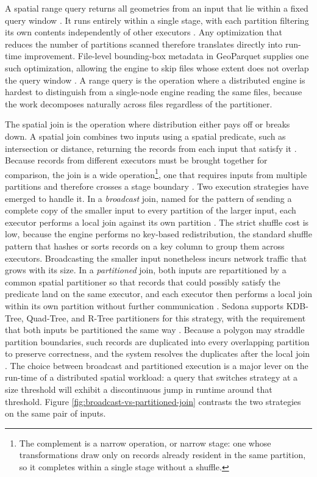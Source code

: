 A spatial range query returns all geometries from an input that lie within a fixed query window \parencite{yu2019_geospark_perspective_beyond}. It runs entirely within a single stage, with each partition filtering its own contents independently of other executors \parencite{yu2019_geospark_perspective_beyond}. Any optimization that reduces the number of partitions scanned therefore translates directly into run-time improvement. File-level bounding-box metadata in GeoParquet supplies one such optimization, allowing the engine to skip files whose extent does not overlap the query window \parencite{sedona2024_geoparquet_loader}. A range query is the operation where a distributed engine is hardest to distinguish from a single-node engine reading the same files, because the work decomposes naturally across files regardless of the partitioner.

The spatial join is the operation where distribution either pays off or breaks down. A spatial join combines two inputs using a spatial predicate, such as intersection or distance, returning the records from each input that satisfy it \parencite{yu2019_geospark_perspective_beyond}. Because records from different executors must be brought together for comparison, the join is a wide operation\footnote{The complement is a narrow operation, or narrow stage: one whose transformations draw only on records already resident in the same partition, so it completes within a single stage without a shuffle.}, one that requires inputs from multiple partitions and therefore crosses a stage boundary \parencite{yu2019_geospark_perspective_beyond}. Two execution strategies have emerged to handle it. In a \emph{broadcast} join, named for the pattern of sending a complete copy of the smaller input to every partition of the larger input, each executor performs a local join against its own partition \parencite{yu2019_geospark_perspective_beyond}. The strict shuffle cost is low, because the engine performs no key-based redistribution, the standard shuffle pattern that hashes or sorts records on a key column to group them across executors. Broadcasting the smaller input nonetheless incurs network traffic that grows with its size. In a \emph{partitioned} join, both inputs are repartitioned by a common spatial partitioner so that records that could possibly satisfy the predicate land on the same executor, and each executor then performs a local join within its own partition without further communication \parencite{yu2019_geospark_perspective_beyond}. Sedona supports KDB-Tree, Quad-Tree, and R-Tree partitioners for this strategy, with the requirement that both inputs be partitioned the same way \parencite{sedona2024_spatial_rdd_application}. Because a polygon may straddle partition boundaries, such records are duplicated into every overlapping partition to preserve correctness, and the system resolves the duplicates after the local join \parencite{yu2019_geospark_perspective_beyond}. The choice between broadcast and partitioned execution is a major lever on the run-time of a distributed spatial workload: a query that switches strategy at a size threshold will exhibit a discontinuous jump in runtime around that threshold. Figure \ref{fig:broadcast-vs-partitioned-join} contrasts the two strategies on the same pair of inputs.

